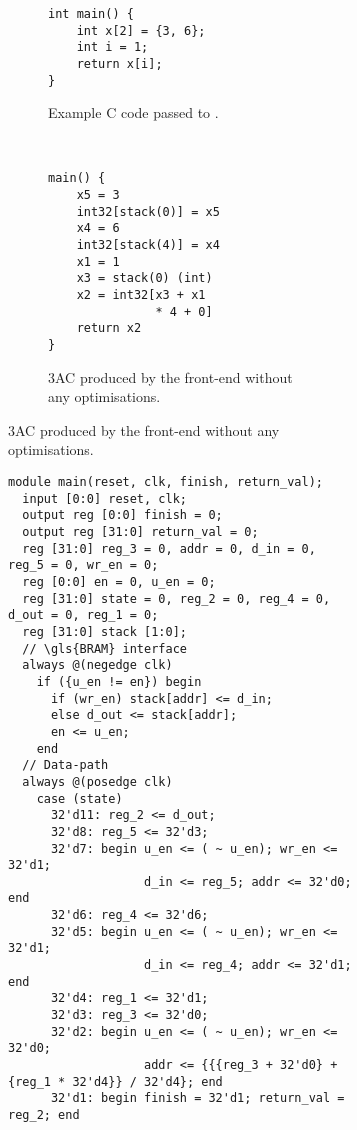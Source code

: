 \begin{figure}
  \centering
  \begin{subfigure}[b]{0.3\linewidth}
    \begin{subfigure}[t]{1\linewidth}
\begin{verbatim}
int main() {
    int x[2] = {3, 6};
    int i = 1;
    return x[i];
}
\end{verbatim}
      \caption{Example C code passed to \vericert{}.}\label{fig:accumulator_c}
    \end{subfigure}\\\vspace{3em}
    \begin{subfigure}[b]{1\linewidth}
\begin{verbatim}
main() {
    x5 = 3
    int32[stack(0)] = x5
    x4 = 6
    int32[stack(4)] = x4
    x1 = 1
    x3 = stack(0) (int)
    x2 = int32[x3 + x1
               * 4 + 0]
    return x2
}
\end{verbatim}
      \caption{3AC produced by the \compcert{} front-end without any optimisations.}\label{fig:accumulator_rtl}
    \end{subfigure}
  \end{subfigure}\hfill%
  \begin{subfigure}[b]{0.65\linewidth}
\begin{verbatim}
module main(reset, clk, finish, return_val);
  input [0:0] reset, clk;
  output reg [0:0] finish = 0;
  output reg [31:0] return_val = 0;
  reg [31:0] reg_3 = 0, addr = 0, d_in = 0, reg_5 = 0, wr_en = 0;
  reg [0:0] en = 0, u_en = 0;
  reg [31:0] state = 0, reg_2 = 0, reg_4 = 0, d_out = 0, reg_1 = 0;
  reg [31:0] stack [1:0];
  // \gls{BRAM} interface
  always @(negedge clk)
    if ({u_en != en}) begin
      if (wr_en) stack[addr] <= d_in;
      else d_out <= stack[addr];
      en <= u_en;
    end
  // Data-path
  always @(posedge clk)
    case (state)
      32'd11: reg_2 <= d_out;
      32'd8: reg_5 <= 32'd3;
      32'd7: begin u_en <= ( ~ u_en); wr_en <= 32'd1;
                   d_in <= reg_5; addr <= 32'd0; end
      32'd6: reg_4 <= 32'd6;
      32'd5: begin u_en <= ( ~ u_en); wr_en <= 32'd1;
                   d_in <= reg_4; addr <= 32'd1; end
      32'd4: reg_1 <= 32'd1;
      32'd3: reg_3 <= 32'd0;
      32'd2: begin u_en <= ( ~ u_en); wr_en <= 32'd0;
                   addr <= {{{reg_3 + 32'd0} + {reg_1 * 32'd4}} / 32'd4}; end
      32'd1: begin finish = 32'd1; return_val = reg_2; end

\end{verbatim}
\end{subfigure}
\end{figure}

